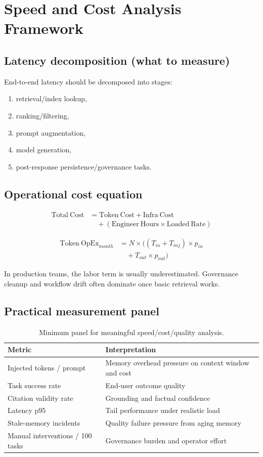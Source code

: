 \documentclass[10pt,twocolumn]{article}
\begin{document}
\section{Speed and Cost Analysis Framework}
\subsection{Latency decomposition (what to measure)}
End-to-end latency should be decomposed into stages:
\begin{enumerate}
  \item retrieval/index lookup,
  \item ranking/filtering,
  \item prompt augmentation,
  \item model generation,
  \item post-response persistence/governance tasks.
\end{enumerate}

\subsection{Operational cost equation}
\begin{align*}
\mathrm{Total\ Cost} &= \mathrm{Token\ Cost} + \mathrm{Infra\ Cost}\\
&\quad + (\mathrm{Engineer\ Hours} \times \mathrm{Loaded\ Rate})
\end{align*}

\begin{align*}
\mathrm{Token\ OpEx}_{month} &= N \times ((T_{in}+T_{inj}) \times p_{in}\\
&\quad + T_{out} \times p_{out})
\end{align*}

In production teams, the labor term is usually underestimated. Governance cleanup and workflow drift often dominate once basic retrieval works.

\subsection{Practical measurement panel}
\begin{table}[h]
\centering
\small
\begin{tabularx}{\columnwidth}{>{\raggedright\arraybackslash}p{} >{\raggedright\arraybackslash}X}
\toprule
\textbf{Metric} & \textbf{Interpretation} \\
\midrule
Injected tokens / prompt & Memory overhead pressure on context window and cost \\
Task success rate & End-user outcome quality \\
Citation validity rate & Grounding and factual confidence \\
Latency p95 & Tail performance under realistic load \\
Stale-memory incidents & Quality failure pressure from aging memory \\
Manual interventions / 100 tasks & Governance burden and operator effort \\
\bottomrule
\end{tabularx}
\caption{Minimum panel for meaningful speed/cost/quality analysis.}
\end{table}
\end{document}
